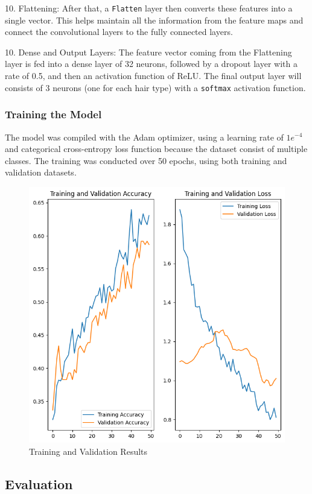10. Flattening: After that, a \texttt{Flatten} layer then converts these features into a single vector. This helps maintain all the information from the feature maps and connect the convolutional layers to the fully connected layers.

10. Dense and Output Layers: The feature vector coming from the Flattening layer is fed into a dense layer of 32 neurons, followed by a dropout layer with a rate of 0.5, and then an activation function of ReLU. The final output layer will consists of 3 neurons (one for each hair type) with a \texttt{softmax} activation function.

\subsubsection{Training the Model}

The model was compiled with the Adam optimizer, using a learning rate of $1e^{-4}$ and categorical cross-entropy loss function because the dataset consist of multiple classes. The training was conducted over 50 epochs, using both training and validation datasets.

\begin{figure}[H]
  \centering
  \includegraphics[width=0.8\linewidth]{figures/training_validation_results.png}
  \caption{Training and Validation Results}
  \label{fig:results}
\end{figure}

\subsection{Evaluation}

